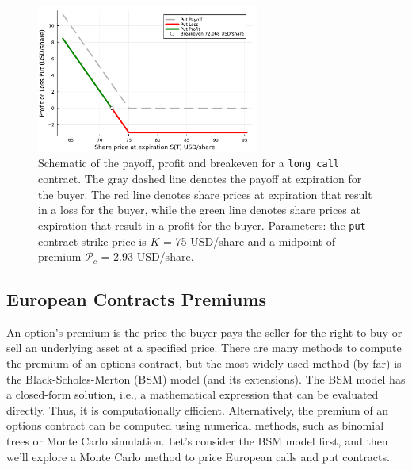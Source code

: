 \documentclass[11pt]{article}
\theoremstyle{definition}
\begin{document}
\begin{figure}[ht]
    \centering
    \includegraphics[width=0.65\textwidth]{./figs/Fig-Example-Put-K75-62DTE.pdf}
    \caption{Schematic of the payoff, profit and breakeven for a \texttt{long call} 
	contract. The gray dashed line denotes the payoff at expiration for the buyer.
	The red line denotes share prices at expiration that result in a loss for the buyer, 
	while the green line denotes share prices at expiration that result in a profit for the buyer.
	Parameters: the \texttt{put} 
	contract strike price is $K$ = 75 USD/share and a midpoint of premium $\mathcal{P}_{c}$ = 2.93 USD/share.}\label{fig:put-payoff-profit-breakeven-diagram}
\end{figure}


\subsection{European Contracts Premiums}
An option's premium is the price the buyer pays the seller for the right to buy or sell an underlying asset at a specified price.
There are many methods to compute the premium of an options contract, but the most widely used method (by far) is the Black-Scholes-Merton (BSM) model (and its extensions).
The BSM model has a closed-form solution, i.e., a mathematical expression that can be evaluated directly. Thus, it is computationally efficient.
Alternatively, the premium of an options contract can be computed using numerical methods, such as binomial trees or Monte Carlo simulation.
Let's consider the BSM model first, and then we'll explore a Monte Carlo method to price European calls and put contracts.
\end{document}
